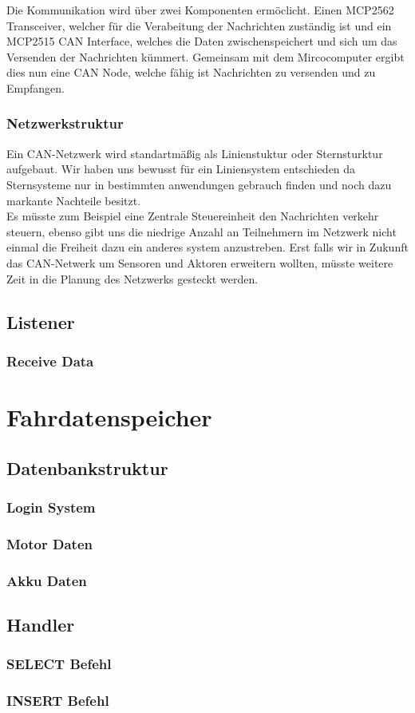 Die Kommunikation wird über zwei Komponenten ermöclicht. Einen MCP2562 Transceiver, welcher für die Verabeitung der Nachrichten zuständig ist und ein MCP2515 CAN Interface, welches die Daten zwischenspeichert und sich um das Versenden der Nachrichten kümmert. Gemeinsam mit dem Mircocomputer ergibt dies nun eine CAN Node, welche fähig ist Nachrichten zu versenden und zu Empfangen.
\subsubsection{Netzwerkstruktur}
Ein CAN-Netzwerk wird standartmäßig als Linienstuktur oder Sternsturktur aufgebaut. Wir haben uns bewusst für ein Liniensystem entschieden da Sternsysteme nur in bestimmten anwendungen gebrauch finden und noch dazu markante Nachteile besitzt.\\ Es müsste zum Beispiel eine Zentrale Steuereinheit den Nachrichten verkehr steuern, ebenso gibt uns die niedrige Anzahl an Teilnehmern im Netzwerk nicht einmal die Freiheit dazu ein anderes system anzustreben. Erst falls wir in Zukunft das CAN-Netwerk um Sensoren und Aktoren erweitern wollten, müsste weitere Zeit in die Planung des Netzwerks gesteckt werden. 

\newpage

\subsection{Listener}
\subsubsection{Receive Data}

\newpage


\section{Fahrdatenspeicher}
\subsection{Datenbankstruktur}
\subsubsection{Login System}
\subsubsection{Motor Daten}
\subsubsection{Akku Daten}
\subsection{Handler}
\subsubsection{SELECT Befehl}
\subsubsection{INSERT Befehl}

\newpage